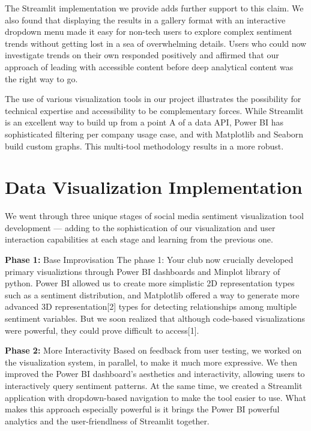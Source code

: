 \documentclass[conference]{IEEEtran}
\begin{document}
The Streamlit implementation we provide adds further support to this claim. We also found that displaying the results in a gallery format with an interactive dropdown menu made it easy for non-tech users to explore complex sentiment trends without getting lost in a sea of overwhelming details. Users who could now investigate trends on their own responded positively and affirmed that our approach of leading with accessible content before deep analytical content was the right way to go.

The use of various visualization tools in our project illustrates the possibility for technical expertise and accessibility to be complementary forces. While Streamlit is an excellent way to build up from a point A of a data API, Power BI has sophisticated filtering per company usage case, and with Matplotlib and Seaborn build custom graphs. This multi-tool methodology results in a more robust.

\section{Data Visualization Implementation}
We went through three unique stages of social media sentiment visualization tool development — adding to the sophistication of our visualization and user interaction capabilities at each stage and learning from the previous one.



\textbf{Phase 1:} Base Improvisation The phase 1: Your club now crucially developed primary visualiztions through Power BI dashboards and Minplot library of python. Power BI allowed us to create more simplistic 2D representation types such as a sentiment distribution, and Matplotlib offered a way to generate more advanced 3D representation[2] types for detecting relationships among multiple sentiment variables. But we soon realized that although code-based visualizations were powerful, they could prove difficult to access[1].

\textbf{Phase 2:} More Interactivity Based on feedback from user testing, we worked on the visualization system, in parallel, to make it much more expressive. We then improved the Power BI dashboard's aesthetics and interactivity, allowing users to interactively query sentiment patterns. At the same time, we created a Streamlit application with dropdown-based navigation to make the tool easier to use. What makes this approach especially powerful is it brings the Power BI powerful analytics and the user-friendlness of Streamlit together.
\end{document}
